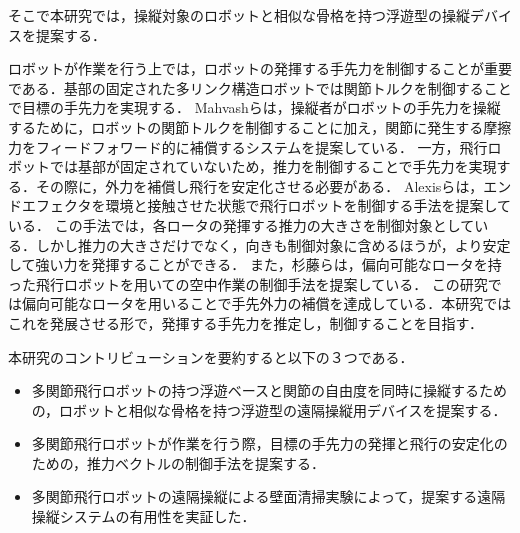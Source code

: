 \documentclass{jarticle}
\begin{document}
そこで本研究では，操縦対象のロボットと相似な骨格を持つ浮遊型の操縦デバイスを提案する．

ロボットが作業を行う上では，ロボットの発揮する手先力を制御することが重要である．基部の固定された多リンク構造ロボットでは関節トルクを制御することで目標の手先力を実現する．
Mahvashら\cite{Mahvash}は，操縦者がロボットの手先力を操縦するために，ロボットの関節トルクを制御することに加え，関節に発生する摩擦力をフィードフォワード的に補償するシステムを提案している．
一方，飛行ロボットでは基部が固定されていないため，推力を制御することで手先力を実現する．その際に，外力を補償し飛行を安定化させる必要がある．
Alexisら\cite{Alexis}は，エンドエフェクタを環境と接触させた状態で飛行ロボットを制御する手法を提案している．
この手法では，各ロータの発揮する推力の大きさを制御対象としている．しかし推力の大きさだけでなく，向きも制御対象に含めるほうが，より安定して強い力を発揮することができる．
また，杉藤ら\cite{sugito}は，偏向可能なロータを持った飛行ロボットを用いての空中作業の制御手法を提案している．
この研究では偏向可能なロータを用いることで手先外力の補償を達成している．本研究ではこれを発展させる形で，発揮する手先力を推定し，制御することを目指す．


本研究のコントリビューションを要約すると以下の３つである．
\begin{itemize}
\item 多関節飛行ロボットの持つ浮遊ベースと関節の自由度を同時に操縦するための，ロボットと相似な骨格を持つ浮遊型の遠隔操縦用デバイスを提案する．
\item 多関節飛行ロボットが作業を行う際，目標の手先力の発揮と飛行の安定化のための，推力ベクトルの制御手法を提案する．
\item 多関節飛行ロボットの遠隔操縦による壁面清掃実験によって，提案する遠隔操縦システムの有用性を実証した．
\end{itemize}
\end{document}
